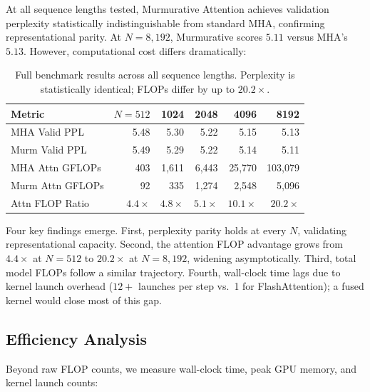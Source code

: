 \documentclass{article}
\begin{document}
At all sequence lengths tested, Murmurative Attention achieves validation perplexity statistically indistinguishable from standard MHA, confirming representational parity. At $N = 8{,}192$, Murmurative scores $5.11$ versus MHA's $5.13$. However, computational cost differs dramatically:

\begin{table}[H]
\centering
\caption{Full benchmark results across all sequence lengths. Perplexity is statistically identical; FLOPs differ by up to $20.2\times$.}
\label{tab:results}
\begin{tabular}{@{}lrrrrr@{}}
\toprule
\textbf{Metric} & \textbf{$N=512$} & \textbf{1024} & \textbf{2048} & \textbf{4096} & \textbf{8192} \\
\midrule
MHA Valid PPL   & 5.48 & 5.30 & 5.22 & 5.15 & 5.13 \\
Murm Valid PPL  & 5.49 & 5.29 & 5.22 & 5.14 & 5.11 \\
MHA Attn GFLOPs & 403  & 1{,}611 & 6{,}443 & 25{,}770 & 103{,}079 \\
Murm Attn GFLOPs & 92 & 335 & 1{,}274 & 2{,}548 & 5{,}096 \\
Attn FLOP Ratio & $4.4\times$ & $4.8\times$ & $5.1\times$ & $10.1\times$ & $20.2\times$ \\
\bottomrule
\end{tabular}
\end{table}

Four key findings emerge. First, perplexity parity holds at every $N$, validating representational capacity. Second, the attention FLOP advantage grows from $4.4\times$ at $N=512$ to $20.2\times$ at $N=8{,}192$, widening asymptotically. Third, total model FLOPs follow a similar trajectory. Fourth, wall-clock time lags due to kernel launch overhead ($12+$ launches per step vs.\ 1 for FlashAttention); a fused kernel would close most of this gap.

\subsection{Efficiency Analysis}

Beyond raw FLOP counts, we measure wall-clock time, peak GPU memory, and kernel launch counts:
\end{document}

